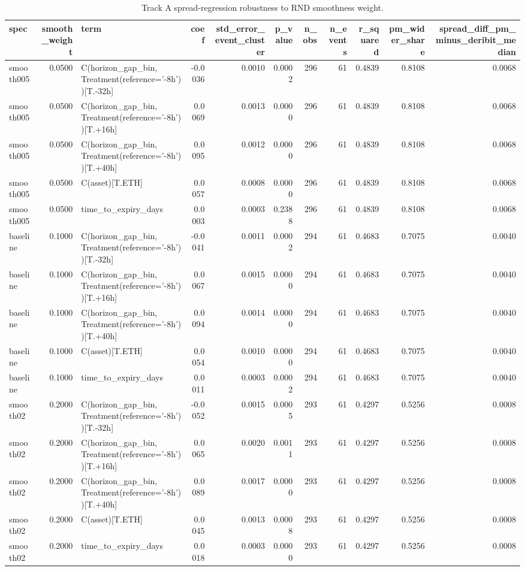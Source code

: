 \begin{table}
\caption{Track A spread-regression robustness to RND smoothness weight.}
\label{tab:trackA_smoothness_regression_robustness}
\begin{tabular}{lrlrrrrrrrr}
\toprule
spec & smooth\_weight & term & coef & std\_error\_event\_cluster & p\_value & n\_obs & n\_events & r\_squared & pm\_wider\_share & spread\_diff\_pm\_minus\_deribit\_median \\
\midrule
smooth005 & 0.0500 & C(horizon\_gap\_bin, Treatment(reference='-8h'))[T.-32h] & -0.0036 & 0.0010 & 0.0002 & 296 & 61 & 0.4839 & 0.8108 & 0.0068 \\
smooth005 & 0.0500 & C(horizon\_gap\_bin, Treatment(reference='-8h'))[T.+16h] & 0.0069 & 0.0013 & 0.0000 & 296 & 61 & 0.4839 & 0.8108 & 0.0068 \\
smooth005 & 0.0500 & C(horizon\_gap\_bin, Treatment(reference='-8h'))[T.+40h] & 0.0095 & 0.0012 & 0.0000 & 296 & 61 & 0.4839 & 0.8108 & 0.0068 \\
smooth005 & 0.0500 & C(asset)[T.ETH] & 0.0057 & 0.0008 & 0.0000 & 296 & 61 & 0.4839 & 0.8108 & 0.0068 \\
smooth005 & 0.0500 & time\_to\_expiry\_days & 0.0003 & 0.0003 & 0.2388 & 296 & 61 & 0.4839 & 0.8108 & 0.0068 \\
baseline & 0.1000 & C(horizon\_gap\_bin, Treatment(reference='-8h'))[T.-32h] & -0.0041 & 0.0011 & 0.0002 & 294 & 61 & 0.4683 & 0.7075 & 0.0040 \\
baseline & 0.1000 & C(horizon\_gap\_bin, Treatment(reference='-8h'))[T.+16h] & 0.0067 & 0.0015 & 0.0000 & 294 & 61 & 0.4683 & 0.7075 & 0.0040 \\
baseline & 0.1000 & C(horizon\_gap\_bin, Treatment(reference='-8h'))[T.+40h] & 0.0094 & 0.0014 & 0.0000 & 294 & 61 & 0.4683 & 0.7075 & 0.0040 \\
baseline & 0.1000 & C(asset)[T.ETH] & 0.0054 & 0.0010 & 0.0000 & 294 & 61 & 0.4683 & 0.7075 & 0.0040 \\
baseline & 0.1000 & time\_to\_expiry\_days & 0.0011 & 0.0003 & 0.0002 & 294 & 61 & 0.4683 & 0.7075 & 0.0040 \\
smooth02 & 0.2000 & C(horizon\_gap\_bin, Treatment(reference='-8h'))[T.-32h] & -0.0052 & 0.0015 & 0.0005 & 293 & 61 & 0.4297 & 0.5256 & 0.0008 \\
smooth02 & 0.2000 & C(horizon\_gap\_bin, Treatment(reference='-8h'))[T.+16h] & 0.0065 & 0.0020 & 0.0011 & 293 & 61 & 0.4297 & 0.5256 & 0.0008 \\
smooth02 & 0.2000 & C(horizon\_gap\_bin, Treatment(reference='-8h'))[T.+40h] & 0.0089 & 0.0017 & 0.0000 & 293 & 61 & 0.4297 & 0.5256 & 0.0008 \\
smooth02 & 0.2000 & C(asset)[T.ETH] & 0.0045 & 0.0013 & 0.0008 & 293 & 61 & 0.4297 & 0.5256 & 0.0008 \\
smooth02 & 0.2000 & time\_to\_expiry\_days & 0.0018 & 0.0003 & 0.0000 & 293 & 61 & 0.4297 & 0.5256 & 0.0008 \\
\bottomrule
\end{tabular}
\end{table}
